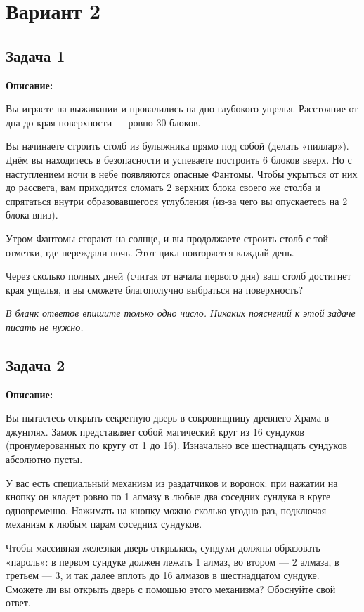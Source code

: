 \documentclass[12pt,a4paper]{article}
\begin{document}
\large

\section{Вариант 2}

\subsection{Задача 1}

\textbf{Описание:}

Вы играете на выживании и провалились на дно глубокого ущелья. Расстояние от дна до края поверхности — ровно 30 блоков. 

Вы начинаете строить столб из булыжника прямо под собой (делать «пиллар»). Днём вы находитесь в безопасности и успеваете построить 6 блоков вверх. 
Но с наступлением ночи в небе появляются опасные Фантомы. Чтобы укрыться от них до рассвета, вам приходится сломать 2 верхних блока своего же столба и спрятаться внутри образовавшегося углубления (из-за чего вы опускаетесь на 2 блока вниз). 

Утром Фантомы сгорают на солнце, и вы продолжаете строить столб с той отметки, где переждали ночь. Этот цикл повторяется каждый день.

Через сколько полных дней (считая от начала первого дня) ваш столб достигнет края ущелья, и вы сможете благополучно выбраться на поверхность? 

\textit{В бланк ответов впишите только одно число. Никаких пояснений к этой задаче писать не нужно.}

\newpage

\subsection{Задача 2}

\textbf{Описание:}

Вы пытаетесь открыть секретную дверь в сокровищницу древнего Храма в джунглях. Замок представляет собой магический круг из 16 сундуков (пронумерованных по кругу от 1 до 16). Изначально все шестнадцать сундуков абсолютно пусты. 

У вас есть специальный механизм из раздатчиков и воронок: при нажатии на кнопку он кладет ровно по 1 алмазу в любые два соседних сундука в круге одновременно. Нажимать на кнопку можно сколько угодно раз, подключая механизм к любым парам соседних сундуков.

Чтобы массивная железная дверь открылась, сундуки должны образовать «пароль»: в первом сундуке должен лежать 1 алмаз, во втором — 2 алмаза, в третьем — 3, и так далее вплоть до 16 алмазов в шестнадцатом сундуке. 
Сможете ли вы открыть дверь с помощью этого механизма? Обоснуйте свой ответ.
\end{document}
